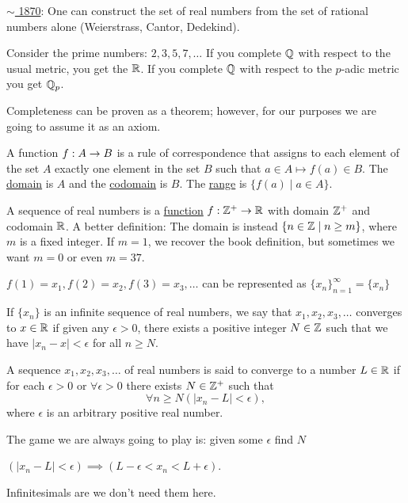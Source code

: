 \documentclass[]{article}
\begin{document}
\ul{$\sim$ 1870}: One can construct the set of real numbers from the set of rational numbers alone (Weierstrass, Cantor, Dedekind).

Consider the prime numbers: $2,3,5,7,\dots$
If you complete $\mathbb{Q}$ with respect to the usual metric, you get the $\mathbb{R}$. If you complete $\mathbb{Q}$ with respect to the $p$-adic metric you get $\mathbb{Q}_p$.

Completeness can be proven as a theorem; however, for our purposes we are going to assume it as an axiom.

\begin{definition}
	[Function] A function $f:A\rightarrow B$ is a rule of correspondence that assigns to each element of the set $A$ exactly one element in the set $B$ such that $a\in A \mapsto f(a) \in B$. The \ul{domain} is $A$ and the \ul{codomain} is $B$. The \ul{range} is $\{f(a) \mid a\in A\}$.
\end{definition}

\begin{definition}
	 A sequence of real numbers is a \ul{function} $f:\mathbb{Z}^+ \rightarrow \mathbb{R}$ with domain $\mathbb{Z}^+$ and codomain $\mathbb{R}$. A better definition: The domain is instead $\{n\in \mathbb{Z}\mid n\geq m\}$, where $m$ is a fixed integer. If $m=1$, we recover the book definition, but sometimes we want $m=0$ or even $m=37$.
\end{definition}

$f(1)=x_1,f(2)=x_2, f(3)=x_3,\dots$ can be represented as $\{x_n\}_{n=1}^\infty = \{x_n\}$

\begin{definition}
	If $\{x_n\}$ is an infinite sequence of real numbers, we say that $x_1,x_2,x_3,\dots$ converges to $x\in\mathbb{R}$ if given any $\epsilon>0$, there exists a positive integer $N\in\mathbb{Z}$ such that we have $|x_n-x|<\epsilon$ for all $n\geq N$.
\end{definition}

\begin{definition}
	A sequence $x_1,x_2,x_3,\dots$ of real numbers is said to converge to a number $L\in\mathbb{R}$ if for each $\epsilon>0$ or $\forall\epsilon>0$ there exists $N\in\mathbb{Z}^+$ such that \begin{equation*} \label{eq1}
	\forall n\geq N(|x_n -L|<\epsilon),
	\end{equation*}
	where $\epsilon$ is an arbitrary positive real number.
\end{definition}
The game we are always going to play is: given some $\epsilon$ find $N$
\begin{note}
	$(|x_n-L|<\epsilon) \implies (L-\epsilon<x_n<L+\epsilon)$.
\end{note}
\begin{remark}
	Infinitesimals are  we don't need them here.
\end{remark}
\end{document}
